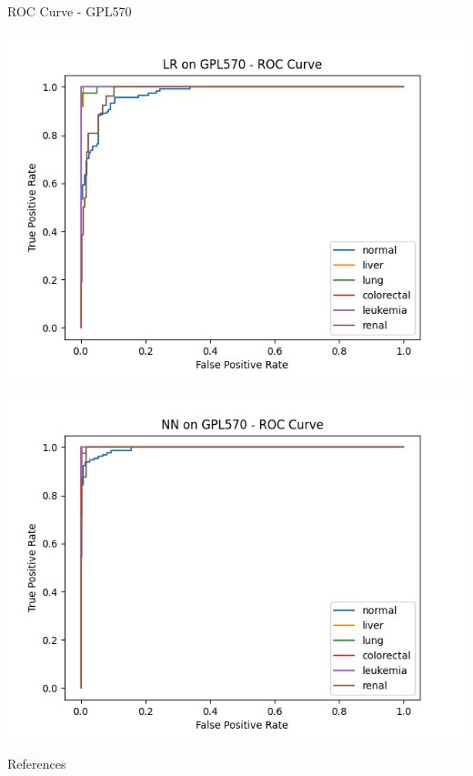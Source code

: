 \documentclass{beamer}
\begin{document}
    \begin{frame}{ROC Curve - GPL570}
        \begin{center}
            \hspace{-60pt}
            \begin{minipage}{0.4\textwidth}
                \includegraphics[scale=.4]{LRonGPL570ROC.png}
            \end{minipage}
            \hspace{40pt}
            \begin{minipage}{0.4\textwidth}
                \includegraphics[scale=.4]{NNonGPL570ROC.png}
            \end{minipage}
        \end{center}
    \end{frame}
    \fi
    
    \begin{frame}{References}
        \nocite{*}
        \printbibliography
    \end{frame}
\end{document}
